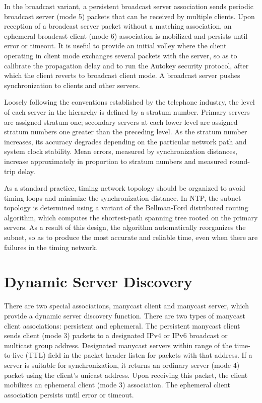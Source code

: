 In the broadcast variant, a persistent broadcast server association
sends periodic broadcast server (mode 5) packets that can be received
by multiple clients. Upon reception of a broadcast server packet
without a matching association, an ephemeral broadcast client (mode
6) association is mobilized and persists until error or timeout. It
is useful to provide an initial volley where the client operating in
client mode exchanges several packets with the server, so as to
calibrate the propagation delay and to run the Autokey security
protocol, after which the client reverts to broadcast client mode. A
broadcast server pushes synchronization to clients and other servers.

Loosely following the conventions established by the telephone
industry, the level of each server in the hierarchy is defined by a
stratum number. Primary servers are assigned stratum one; secondary
servers at each lower level are assigned stratum numbers one greater
than the preceding level. As the stratum number increases, its
accuracy degrades depending on the particular network path and system
clock stability. Mean errors, measured by synchronization distances,
increase approximately in proportion to stratum numbers and measured
round-trip delay.

As a standard practice, timing network topology should be organized
to avoid timing loops and minimize the synchronization distance. In
NTP, the subnet topology is determined using a variant of the
Bellman-Ford distributed routing algorithm, which computes the
shortest-path spanning tree rooted on the primary servers. As a
result of this design, the algorithm automatically reorganizes the
subnet, so as to produce the most accurate and reliable time, even
when there are failures in the timing network.

\section{Dynamic Server Discovery}
\label{section-3-1}

There are two special associations, manycast client and manycast
server, which provide a dynamic server discovery function. There are
two types of manycast client associations: persistent and ephemeral.
The persistent manycast client sends client (mode 3) packets to a
designated IPv4 or IPv6 broadcast or multicast group address.
Designated manycast servers within range of the time-to-live (TTL)
field in the packet header listen for packets with that address. If
a server is suitable for synchronization, it returns an ordinary
server (mode 4) packet using the client's unicast address. Upon
receiving this packet, the client mobilizes an ephemeral client (mode
3) association. The ephemeral client association persists until
error or timeout.

